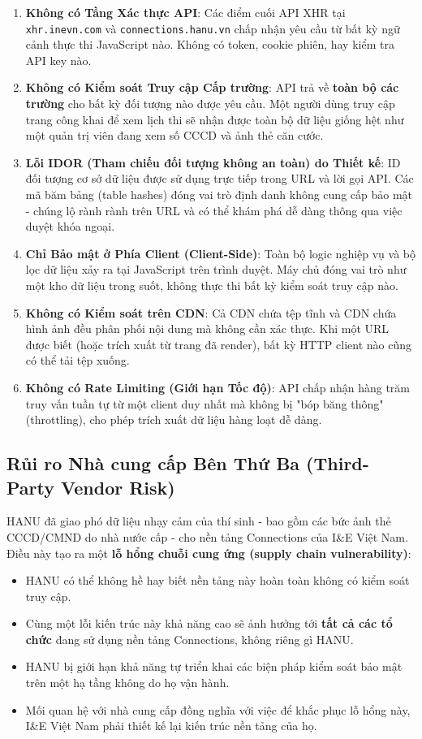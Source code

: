 \documentclass[12pt,a4paper]{article}
\begin{document}
\begin{enumerate}
    \item \textbf{Không có Tầng Xác thực API}: Các điểm cuối API XHR tại \texttt{xhr.inevn.com} và \texttt{connections.hanu.vn} chấp nhận yêu cầu từ bất kỳ ngữ cảnh thực thi JavaScript nào. Không có token, cookie phiên, hay kiểm tra API key nào.
    \item \textbf{Không có Kiểm soát Truy cập Cấp trường}: API trả về \textbf{toàn bộ các trường} cho bất kỳ đối tượng nào được yêu cầu. Một người dùng truy cập trang công khai để xem lịch thi sẽ nhận được toàn bộ dữ liệu giống hệt như một quản trị viên đang xem số CCCD và ảnh thẻ căn cước.
    \item \textbf{Lỗi IDOR (Tham chiếu đối tượng không an toàn) do Thiết kế}: ID đối tượng cơ sở dữ liệu được sử dụng trực tiếp trong URL và lời gọi API. Các mã băm bảng (table hashes) đóng vai trò định danh không cung cấp bảo mật - chúng lộ rành rành trên URL và có thể khám phá dễ dàng thông qua việc duyệt khóa ngoại.
    \item \textbf{Chỉ Bảo mật ở Phía Client (Client-Side)}: Toàn bộ logic nghiệp vụ và bộ lọc dữ liệu xảy ra tại JavaScript trên trình duyệt. Máy chủ đóng vai trò như một kho dữ liệu trong suốt, không thực thi bất kỳ kiểm soát truy cập nào.
    \item \textbf{Không có Kiểm soát trên CDN}: Cả CDN chứa tệp tĩnh và CDN chứa hình ảnh đều phân phối nội dung mà không cần xác thực. Khi một URL được biết (hoặc trích xuất từ trang đã render), bất kỳ HTTP client nào cũng có thể tải tệp xuống.
    \item \textbf{Không có Rate Limiting (Giới hạn Tốc độ)}: API chấp nhận hàng trăm truy vấn tuần tự từ một client duy nhất mà không bị "bóp băng thông" (throttling), cho phép trích xuất dữ liệu hàng loạt dễ dàng.
\end{enumerate}

\subsection{Rủi ro Nhà cung cấp Bên Thứ Ba (Third-Party Vendor Risk)}

HANU đã giao phó dữ liệu nhạy cảm của thí sinh - bao gồm các bức ảnh thẻ CCCD/CMND do nhà nước cấp - cho nền tảng Connections của I\&E Việt Nam. Điều này tạo ra một \textbf{lỗ hổng chuỗi cung ứng (supply chain vulnerability)}:

\begin{itemize}
    \item HANU có thể không hề hay biết nền tảng này hoàn toàn không có kiểm soát truy cập.
    \item Cùng một lỗi kiến trúc này khả năng cao sẽ ảnh hưởng tới \textbf{tất cả các tổ chức} đang sử dụng nền tảng Connections, không riêng gì HANU.
    \item HANU bị giới hạn khả năng tự triển khai các biện pháp kiểm soát bảo mật trên một hạ tầng không do họ vận hành.
    \item Mối quan hệ với nhà cung cấp đồng nghĩa với việc để khắc phục lỗ hổng này, I\&E Việt Nam phải thiết kế lại kiến trúc nền tảng của họ.
\end{itemize}
\end{document}
